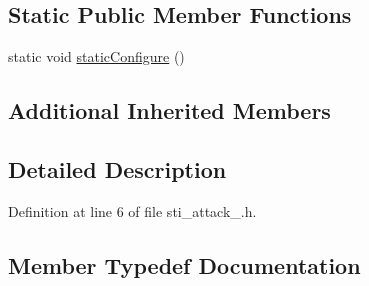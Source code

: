 \subsection*{Static Public Member Functions}
\begin{DoxyCompactItemize}
\item 
static void \hyperlink{structsm__starcraft__ai_1_1attack__inner__states_1_1StiAttack2_ab86bb635738bb7d4d85d663203c8c2d9}{static\+Configure} ()
\end{DoxyCompactItemize}
\subsection*{Additional Inherited Members}


\subsection{Detailed Description}


Definition at line 6 of file sti\+\_\+attack\+\_.\+h.



\subsection{Member Typedef Documentation}
\mbox{\label{structsm__starcraft__ai_1_1attack__inner__states_1_1StiAttack2_a978f087e297634bc2e93830ee485a799}} 
